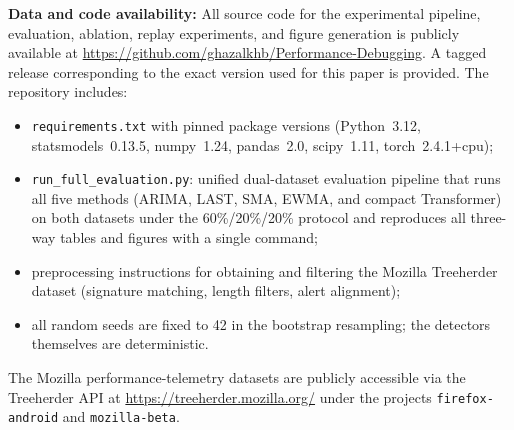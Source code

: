 \documentclass[a4paper,fleqn]{cas-sc}
\theoremstyle{plain}
\begin{document}
\noindent\textbf{Data and code availability:}
All source code for the experimental pipeline, evaluation, ablation, replay
experiments, and figure generation is publicly available at
\url{https://github.com/ghazalkhb/Performance-Debugging}.
A tagged release corresponding to the exact version used for this paper is
provided.
The repository includes:
\begin{itemize}
  \item \texttt{requirements.txt} with pinned package versions
    (Python~3.12, statsmodels~0.13.5, numpy~1.24, pandas~2.0, scipy~1.11,
     torch~2.4.1+cpu);
  \item \texttt{run\_full\_evaluation.py}: unified dual-dataset evaluation
    pipeline that runs all five methods (ARIMA, LAST, SMA, EWMA, and
    compact Transformer) on both datasets under the 60\%/20\%/20\% protocol
    and reproduces all three-way tables and figures with a single command;
  \item preprocessing instructions for obtaining and filtering the Mozilla
    Treeherder dataset (signature matching, length filters, alert alignment);
  \item all random seeds are fixed to 42 in the bootstrap resampling;
    the detectors themselves are deterministic.
\end{itemize}
The Mozilla performance-telemetry datasets are publicly accessible via the
Treeherder API at \url{https://treeherder.mozilla.org/} under the projects
\texttt{firefox-android} and \texttt{mozilla-beta}.



\end{document}
